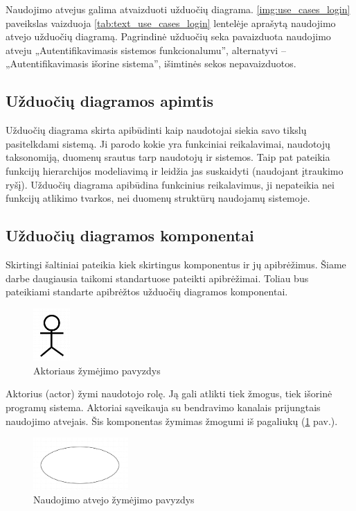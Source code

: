 Naudojimo atvejus galima atvaizduoti užduočių diagrama. \ref{img:use_cases_login} paveikslas vaizduoja \ref{tab:text_use_cases_login} lentelėje aprašytą naudojimo atvejo užduočių diagramą. Pagrindinė užduočių seka pavaizduota naudojimo atveju „Autentifikavimasis sistemos funkcionalumu”,  alternatyvi – „Autentifikavimasis išorine sistema”, išimtinės sekos nepavaizduotos.


\subsection{Užduočių diagramos apimtis}
Užduočių diagrama skirta apibūdinti kaip naudotojai siekia savo tikslų pasitelkdami sistemą. Ji parodo kokie yra funkciniai reikalavimai, naudotojų taksonomiją, duomenų srautus tarp naudotojų ir sistemos. Taip pat pateikia funkcijų hierarchijos modeliavimą ir leidžia jas suskaidyti (naudojant įtraukimo ryšį). Užduočių diagrama apibūdina funkcinius reikalavimus, ji nepateikia nei funkcijų atlikimo tvarkos, nei duomenų struktūrų naudojamų sistemoje.

\subsection{Užduočių diagramos komponentai} \label{section:use_cases_components}
Skirtingi šaltiniai pateikia kiek skirtingus komponentus ir jų apibrėžimus. Šiame darbe daugiausia taikomi \OMG standartuose pateikti apibrėžimai. Toliau bus pateikiami \UML standarte apibrėžtos užduočių diagramos komponentai.

\begin{figure}[H]
	\centering
	\includegraphics[height=2cm]{img/use_case_components/actor}
	\caption{Aktoriaus žymėjimo pavyzdys}
	\label{img:use_case_components_actor}
\end{figure}

Aktorius (actor) žymi naudotojo rolę. Ją gali atlikti tiek žmogus, tiek išorinė programų sistema. Aktoriai sąveikauja su bendravimo kanalais prijungtais naudojimo atvejais. Šis komponentas žymimas žmogumi iš pagaliukų (\ref{img:use_case_components_actor} pav.).

\begin{figure}[H]
	\centering
	\includegraphics[height=2cm]{img/use_case_components/use_case}
	\caption{Naudojimo atvejo žymėjimo pavyzdys}
	\label{img:use_case_components_use_case}
\end{figure}

